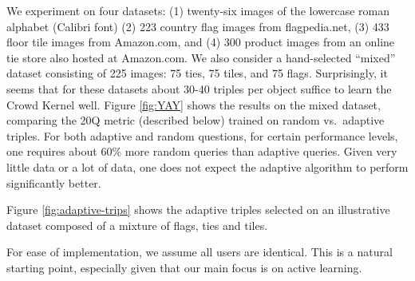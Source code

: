 \documentclass{article}
\begin{document}
We experiment on four datasets: (1) twenty-six images of the lowercase roman alphabet (Calibri font) (2) 223 country flag images from flagpedia.net, (3) 433 floor tile images from Amazon.com, and (4)
300 product images from an online tie store also hosted at Amazon.com. We also consider a hand-selected ``mixed'' dataset consisting of 225 images: 75 ties, 75 tiles, and 75 flags.  Surprisingly, it seems
that for these datasets about 30-40 triples per object suffice to
learn the Crowd Kernel well. Figure \ref{fig:YAY} shows the results on the mixed dataset, comparing the 20Q metric (described below) trained on random vs.~adaptive triples.  For both adaptive and random questions, for certain performance levels, one requires about 60\% more random queries than adaptive queries.  Given very little data or a lot of data, one does not expect the adaptive algorithm to perform significantly better.

Figure \ref{fig:adaptive-trips} shows the adaptive triples selected on
an illustrative dataset composed of a mixture of flags, ties and
tiles.

For ease of implementation, we assume all users are identical.  This
is a natural starting point, especially given that our main focus is
on active learning.
\end{document}
